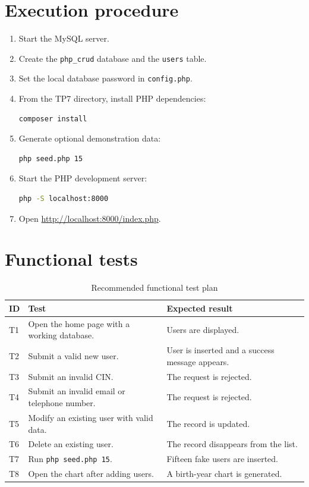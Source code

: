 \documentclass[12pt,a4paper]{article}
\begin{document}
\section{Execution procedure}

\begin{enumerate}
    \item Start the MySQL server.
    \item Create the \texttt{php\_crud} database and the \texttt{users} table.
    \item Set the local database password in \texttt{config.php}.
    \item From the TP7 directory, install PHP dependencies:
\begin{lstlisting}[language=Bash]
composer install
\end{lstlisting}
    \item Generate optional demonstration data:
\begin{lstlisting}[language=Bash]
php seed.php 15
\end{lstlisting}
    \item Start the PHP development server:
\begin{lstlisting}[language=Bash]
php -S localhost:8000
\end{lstlisting}
    \item Open \url{http://localhost:8000/index.php}.
\end{enumerate}

\section{Functional tests}

\begin{table}[H]
\centering
\begin{tabular}{p{}p{}p{}}
\toprule
\textbf{ID} & \textbf{Test} & \textbf{Expected result}\\
\midrule
T1 & Open the home page with a working database. & Users are displayed.\\
T2 & Submit a valid new user. & User is inserted and a success message appears.\\
T3 & Submit an invalid CIN. & The request is rejected.\\
T4 & Submit an invalid email or telephone number. & The request is rejected.\\
T5 & Modify an existing user with valid data. & The record is updated.\\
T6 & Delete an existing user. & The record disappears from the list.\\
T7 & Run \texttt{php seed.php 15}. & Fifteen fake users are inserted.\\
T8 & Open the chart after adding users. & A birth-year chart is generated.\\
\bottomrule
\end{tabular}
\caption{Recommended functional test plan}
\end{table}
\end{document}
